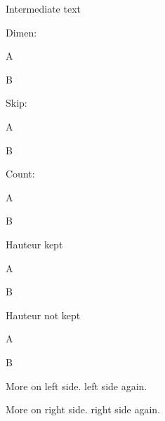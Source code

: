\documentclass[12pt]{article}
\begin{document}
Intermediate text
\makeatletter

Dimen:

A \the\dimen\Afootins

B \the\dimen\Bfootins

Skip:


A \the\skip\Afootins

B \the\skip\Bfootins

Count:


A \the\count\Afootins

B \the\count\Bfootins

Hauteur kept

A \the\ht\Afootins@kept


B \the\ht\Bfootins@kept

Hauteur not kept


A \the\ht\Afootins


B \the\ht\Bfootins
\makeatother
\begin{pages}
  \begin{Leftside}
    \beginnumbering
    \pstart
      More on  left side. \lipsum[1-3] %
    \pend
    \pstart
       left side again.\lipsum[4-7] %
    \pend
    \endnumbering
  \end{Leftside}
  \begin{Rightside}
    \beginnumbering
    \pstart
      More on  right side. \lipsum[1-3] %
    \pend
    \pstart
       right side again.\lipsum[4-7] %
    \pend
    \endnumbering
  \end{Rightside}
\end{pages}
\Pages
\end{document}
